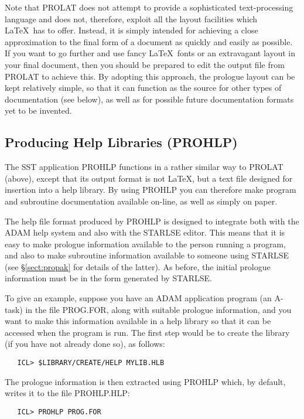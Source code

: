 Note that PROLAT does not attempt to provide a sophisticated text-processing
language and does not, therefore, exploit all the layout facilities which
\LaTeX\ has to offer.
Instead, it is simply intended for achieving a close approximation to the
final form of a document as quickly and easily as possible.
If you want to go further and use fancy \LaTeX\ fonts or an extravagant layout
in your final document, then you should be prepared to edit the output file
from PROLAT to achieve this.
By adopting this approach, the prologue layout can be kept relatively
simple, so that it can function as the source for other types of
documentation (see below), as well as for possible future documentation
formats yet to be invented.

\subsection{Producing Help Libraries (PROHLP)}

The SST application PROHLP functions in a rather similar way to PROLAT
(above), except that its output format is not \LaTeX, but a text file
designed for insertion into a help library.
By using PROHLP you can therefore make program and subroutine documentation
available on-line, as well as simply on paper.

The help file format produced by PROHLP is designed to integrate both with
the ADAM help system and also with the STARLSE editor.
This means that it is easy to make prologue information available to the
person running a program, and also to make subroutine information available
to someone using STARLSE (see \S\ref{sect:propak} for details of the
latter).
As before, the initial prologue information must be in the form generated by
STARLSE.

To give an example, suppose you have an ADAM application program (an A-task)
in the file PROG.FOR, along with suitable prologue information, and you want
to make this information available in a help library so that it can be
accessed when the program is run.
The first step would be to create the library (if you have not already done
so), as follows:

\begin{verbatim}
   ICL> $LIBRARY/CREATE/HELP MYLIB.HLB
\end{verbatim}

The prologue information is then extracted using PROHLP which, by default,
writes it to the file PROHLP.HLP:

\begin{verbatim}
   ICL> PROHLP PROG.FOR
\end{verbatim}

